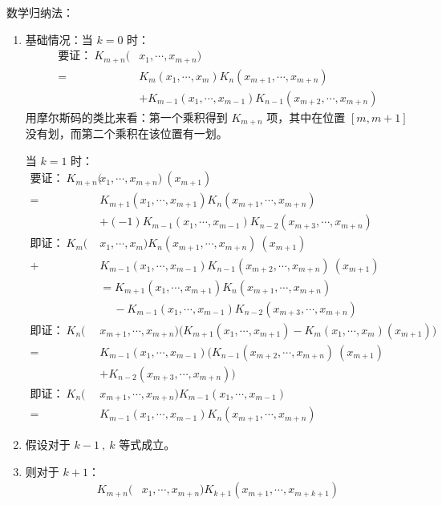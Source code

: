 数学归纳法：
\begin{enumerate}
  \item[1.] 基础情况：当 \( k=0 \) 时：
    \begin{align*}
      \text{要证：} \ K_{m+n}(&x_1, \cdots, x_{m+n}) \\
      = &K_{m}(x_1, \cdots, x_{m}) K_n(x_{m+1}, \cdots, x_{m+n}) \\
      &+ K_{m-1}(x_1, \cdots, x_{m-1}) K_{n-1}(x_{m+2}, \cdots, x_{m+n})
    \end{align*}
    用摩尔斯码的类比来看：第一个乘积得到 \( K_{m+n} \) 项，其中在位置 \( [m, m+1] \) 没有划，而第二个乘积在该位置有一划。

    当 \( k=1 \) 时：
    \begin{align*}
      \text{要证：} \ K_{m+n}(&x_1, \cdots, x_{m+n}) \ (x_{m+1}) \\
      = &K_{m+1}(x_1, \cdots, x_{m+1}) K_n(x_{m+1}, \cdots, x_{m+n}) \\
      &+ (-1) K_{m-1}(x_1, \cdots, x_{m-1}) K_{n-2}(x_{m+3}, \cdots, x_{m+n}) \\
      \text{即证：} \ K_m(&x_1, \cdots, x_m) K_n(x_{m+1}, \cdots, x_{m+n}) \ (x_{m+1}) \\ +
      & K_{m-1}(x_1, \cdots, x_{m-1}) K_{n-1}(x_{m+2}, \cdots, x_{m+n}) \ (x_{m+1}) \\
      &= K_{m+1}(x_1, \cdots, x_{m+1}) K_n(x_{m+1}, \cdots, x_{m+n}) \\
      & \phantom{+} -  K_{m-1}(x_1, \cdots, x_{m-1}) K_{n-2}(x_{m+3}, \cdots, x_{m+n}) \\
      \text{即证：} \ K_n(&x_{m+1}, \cdots, x_{m+n}) \big(K_{m+1}(x_1, \cdots, x_{m+1}) - K_m(x_1, \cdots, x_m) (x_{m+1}) \big) \\
      = & K_{m-1}(x_1, \cdots, x_{m-1}) \big(K_{n-1}(x_{m+2}, \cdots, x_{m+n}) \ (x_{m+1}) \\
      \phantom{=} & + K_{n-2}(x_{m+3}, \cdots, x_{m+n}) \big) \\
      \text{即证：} \ K_n(&x_{m+1}, \cdots, x_{m+n}) K_{m-1}(x_1, \cdots, x_{m-1}) \\
      = & K_{m-1}(x_1, \cdots, x_{m-1}) K_n (x_{m+1}, \cdots, x_{m+n})
    \end{align*}
  \item[2.] 假设对于 \( k-1 \ , \ k \) 等式成立。
  \item[3.] 则对于 \( k+1 \)：
    \begin{align*}
      K_{m+n}(&x_1, \cdots, x_{m+n}) K_{k+1}(x_{m+1}, \cdots, x_{m+k+1}) \\

\end{align*}
\end{enumerate}

